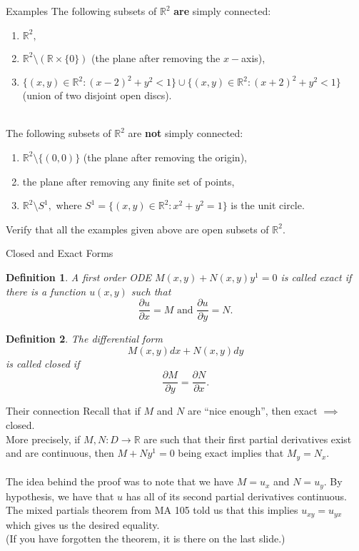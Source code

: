 \documentclass[handout, aspectratio=169]{beamer}
\newtheorem{defn}{Definition}
\begin{document}
\begin{frame}{Examples} 
	The following subsets of $\mathbb{R}^2$ \textbf{are} simply connected:
	\begin{enumerate} 
		\item $\mathbb{R}^2,$
		\item $\mathbb{R}^2 \setminus (\mathbb{R}\times\{0\})$ (the plane after removing the $x-$axis),
		\item $\{(x, y)\in \mathbb{R}^2 : (x - 2)^2 + y^2 < 1\} \cup \{(x, y)\in \mathbb{R}^2 : (x + 2)^2 + y^2 < 1\}$ \\
		(union of two disjoint open discs).\\~\\
	\end{enumerate}
	The following subsets of $\mathbb{R}^2$ are \textbf{not} simply connected:
	\begin{enumerate} 
		\item $\mathbb{R}^2 \setminus \{(0, 0)\}$ (the plane after removing the origin),
		\item the plane after removing any finite set of points,
		\item $\mathbb{R}^2 \setminus S^1,$ where $S^1 = \{(x, y) \in \mathbb{R}^2 : x^2 + y^2 = 1\}$ is the unit circle.
	\end{enumerate}
	Verify that all the examples given above are open subsets of $\mathbb{R}^2.$
\end{frame}
\begin{frame}{Closed and Exact Forms} 
	\begin{defn} 
		A first order ODE $M(x, y) + N(x, y)y^1 = 0$ is called exact if there is a function $u(x, y)$ such that
		\[\frac{\partial u}{\partial x} = M \text{ and } \frac{\partial u}{\partial y} = N.\]
	\end{defn}
	\begin{defn} 
		The differential form
		\[M(x, y)dx + N(x, y)dy\]
		is called closed if
		\[\frac{\partial M}{\partial y} = \frac{\partial N}{\partial x}.\]
	\end{defn}
\end{frame}
\begin{frame}{Their connection} 
	Recall that if $M$ and $N$ are ``nice enough'', then exact $\implies$ closed.\\
	More precisely, if $M, N: D \to \mathbb{R}$ are such that their first partial derivatives exist and are continuous, then $M + Ny^1 = 0$ being exact implies that $M_y = N_x.$\\~\\
	The idea behind the proof was to note that we have $M = u_x$ and $N = u_y.$ By hypothesis, we have that $u$ has all of its second partial derivatives continuous. The mixed partials theorem from MA 105 told us that this implies $u_{xy} = u_{yx}$ which gives us the desired equality.\\
	(If you have forgotten the theorem, it is there on the last slide.)
\end{frame}
\end{document}
